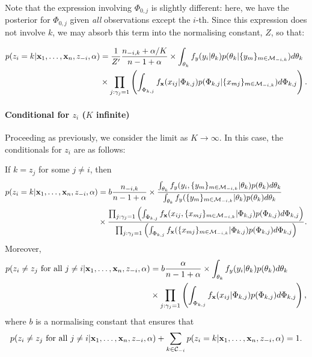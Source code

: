 \documentclass[12pt]{article}
\begin{document}
Note that the expression involving $\Phi_{0,j}$ is slightly different: here, we have the posterior for $\Phi_{0,j}$ given {\em all} observations except the $i$-th.  Since this expression does not involve $k$, we may absorb this term into the normalising constant, $Z$, so that:   

\begin{align}
p(z_i = k| {\bf x}_1,\ldots, {\bf x}_n,z_{-i}, \alpha) &= \frac{1}{Z'} \frac{n_{-i,k} + \alpha/K}{n - 1 + \alpha} \times \int_{\theta_k}f_{y}(y_i | \theta_k) p(\theta_k|\{{ y}_{m}\}_{m\in \mathcal{M}_{-i,k}}) d\theta_k\notag\\
&\times \prod_{j: {\gamma_j} = 1} \left(\int_{\Phi_{k,j}}f_{{\bf x}}(x_{ij} | \Phi_{k,j}) p(\Phi_{k,j}|\{{ x}_{mj}\}_{m\in \mathcal{M}_{-i,k}}) d\Phi_{k,j}\right).\label{condci5_fs}
\end{align} 
\paragraph{Conditional for $z_i$ ($K$ infinite)}

Proceeding as previously, we consider the limit as $K \rightarrow \infty$.  In this case, the conditionals for $z_i$ are as follows:  

\noindent If $k = z_j$ for some $j \ne i$, then\qquad
\begin{align}
p(z_i=k|{\bf x}_1,\ldots, {\bf x}_n,z_{-i}, \alpha) &= b\frac{n_{-i,k}}{n - 1 + \alpha} \times \frac{\int_{\theta_k}f_{y}(y_i,\{{ y}_{m}\}_{m\in \mathcal{M}_{-i,k}} | \theta_k) p(\theta_k) d\theta_k}{\int_{\theta_k}f_{y}(\{{ y}_{m}\}_{m\in \mathcal{M}_{-i,k}} | \theta_k) p(\theta_k) d\theta_k}     \notag\\ 
&\times \frac{\prod_{j: {\gamma_j} = 1} \left(\int_{\Phi_{k,j}}f_{{\bf x}}(x_{ij},\{{ x}_{mj}\}_{m\in \mathcal{M}_{-i,k}} | \Phi_{k,j}) p(\Phi_{k,j}) d\Phi_{k,j}\right)}{\prod_{j: {\gamma_j} = 1} \left(\int_{\Phi_{k,j}}f_{{\bf x}}(\{{ x}_{mj}\}_{m\in \mathcal{M}_{-i,k}} | \Phi_{k,j}) p(\Phi_{k,j}) d\Phi_{k,j}\right)}. \label{infcond1fs}
\end{align}
Moreover, \qquad
\begin{align}
p(z_i \ne z_j \mbox{ for all } j \ne i| {\bf x}_1,\ldots, {\bf x}_n, z_{-i}, \alpha) &= b\frac{\alpha}{n - 1 + \alpha} \times \int_{\theta_k}f_{y}(y_i | \theta_k) p(\theta_k) d\theta_k \notag \\&\times  \prod_{j: {\gamma_j} = 1} \left(\int_{\Phi_{k,j}}f_{{\bf x}}(x_{ij} | \Phi_{k,j}) p(\Phi_{k,j}) d\Phi_{k,j}\right),\label{infcond2fs}
\end{align}
where $b$ is a normalising constant that ensures that 
\begin{equation}
p(z_i \ne z_j \mbox{ for all } j \ne i| {\bf x}_1,\ldots, {\bf x}_n, z_{-i}, \alpha) + \sum_{k \in \mathcal{C}_{-i}} p(z_i=k|{\bf x}_1,\ldots, {\bf x}_n,z_{-i}, \alpha) = 1. \notag
\end{equation}
\end{document}
